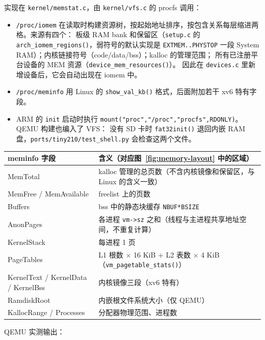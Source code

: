 实现在 \texttt{kernel/memstat.c}，由 \texttt{kernel/vfs.c} 的 procfs 调用：
\begin{itemize}
\item \texttt{/proc/iomem} 在读取时构建资源树，按起始地址排序，按包含关系每层缩进两格。来源有四个：
      板级 RAM bank 和保留区（\texttt{setup.c} 的 \texttt{arch\_iomem\_regions()}，弱符号的默认实现是
      \texttt{EXTMEM..PHYSTOP} 一段 System RAM）；内核链接符号（code/data/bss）；kalloc 的管理范围；
      所有已注册平台设备的 MEM 资源（\texttt{device\_mem\_resources()}）。
      因此在 \texttt{devices.c} 里新增设备后，它会自动出现在 iomem 中。
\item \texttt{/proc/meminfo} 用 Linux 的 \texttt{show\_val\_kb()} 格式，后面附加若干 xv6 特有字段。
\item ARM 的 \texttt{init} 启动时执行 \texttt{mount("proc","/proc","procfs",RDONLY)}。QEMU 构建也编入了 VFS：
      没有 SD 卡时 \texttt{fat32init()} 退回内嵌 RAM 盘，\texttt{ports/tiny210/test\_shell.py} 会检查这两个文件。
\end{itemize}

\begin{longtable}{@{}>{\raggedright\arraybackslash}p{}>{\raggedright\arraybackslash}p{}@{}}
\toprule
meminfo 字段 & 含义（对应图~\ref{fig:memory-layout} 中的区域） \\
\midrule
\endhead
MemTotal & kalloc 管理的总页数（不含内核镜像和保留区，与 Linux 的含义一致） \\
MemFree / MemAvailable & freelist 上的页数 \\
Buffers & bss 中的静态块缓存 \texttt{NBUF*BSIZE} \\
AnonPages & 各进程 \texttt{vm->sz} 之和（线程与主进程共享地址空间，不重复计算） \\
KernelStack & 每进程 1 页 \\
PageTables & L1 根数 $\times$ 16 KiB + L2 表数 $\times$ 4 KiB（\texttt{vm\_pagetable\_stats()}） \\
KernelText / KernelData / KernelBss & 内核镜像三段（xv6 特有） \\
RamdiskRoot & 内嵌根文件系统大小（仅 QEMU） \\
KallocRange / Processes & 分配器物理范围、进程数 \\
\bottomrule
\end{longtable}

QEMU 实测输出：

